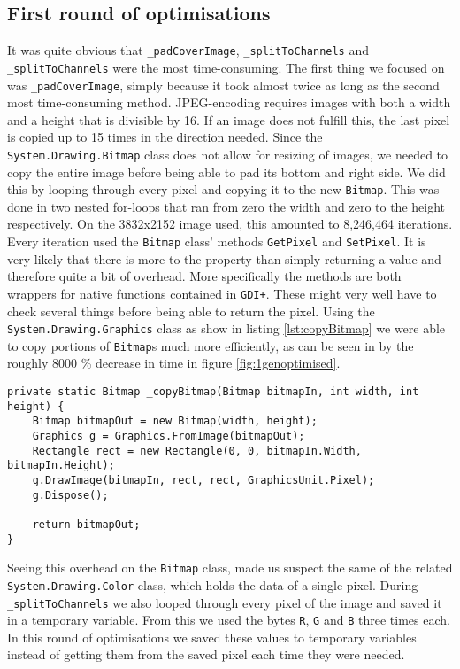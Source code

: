 \subsection{First round of optimisations}
It was quite obvious that \lstinline|_padCoverImage|, \lstinline|_splitToChannels| and \lstinline|_splitToChannels| were the most time-consuming.
The first thing we focused on was \lstinline|_padCoverImage|, simply because it took almost twice as long as the second most time-consuming method.
JPEG-encoding requires images with both a width and a height that is divisible by 16.
If an image does not fulfill this, the last pixel is copied up to 15 times in the direction needed.
Since the \lstinline|System.Drawing.Bitmap| class does not allow for resizing of images, we needed to copy the entire image before being able to pad its bottom and right side.
We did this by looping through every pixel and copying it to the new \lstinline|Bitmap|.
This was done in two nested for-loops that ran from zero the width and zero to the height respectively.
On the 3832x2152 image used, this amounted to 8,246,464 iterations.
Every iteration used the \lstinline|Bitmap| class' methods \lstinline|GetPixel| and \lstinline|SetPixel|.
It is very likely that there is more to the property than simply returning a value and therefore quite a bit of overhead.
More specifically the methods are both wrappers for native functions contained in \lstinline|GDI+|. 
These might very well have to check several things before being able to return the pixel.
Using the \lstinline|System.Drawing.Graphics| class as show in listing \ref{lst:copyBitmap} we were able to copy portions of \lstinline|Bitmap|s much more efficiently, \citep{MSDNBitmap} as can be seen in by the roughly 8000 \% decrease in time in figure \ref{fig:1genoptimised}.

\begin{lstlisting}[firstnumber=684,label=lst:copyBitmap,caption={Copying a \lstinline|Bitmap| using the \lstinline|Graphics| class.}]
private static Bitmap _copyBitmap(Bitmap bitmapIn, int width, int height) {
    Bitmap bitmapOut = new Bitmap(width, height);
    Graphics g = Graphics.FromImage(bitmapOut);
    Rectangle rect = new Rectangle(0, 0, bitmapIn.Width, bitmapIn.Height);
    g.DrawImage(bitmapIn, rect, rect, GraphicsUnit.Pixel);
    g.Dispose();

    return bitmapOut;
}
\end{lstlisting}

Seeing this overhead on the \lstinline|Bitmap| class, made us suspect the same of the related \lstinline|System.Drawing.Color| class, which holds the data of a single pixel.
During \lstinline|_splitToChannels| we also looped through every pixel of the image and saved it in a temporary variable. 
From this we used the bytes \lstinline|R|, \lstinline|G| and \lstinline|B| three times each. 
In this round of optimisations we saved these values to temporary variables instead of getting them from the saved pixel each time they were needed.

